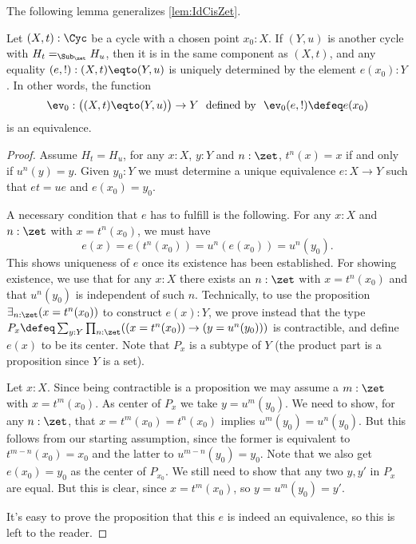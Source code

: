 The following lemma generalizes \cref{lem:IdCisZet}.

\begin{lemma}\label{lem:IdCycle}
  Let $(X,t):\Cyc$ be a cycle with a chosen point $x_0:X$.
  If $(Y,u)$ is another cycle with $H_t =_{\Sub_\zet} H_u$,
  then it is in the same component as $(X,t)$,
  and any equality $(e,!) : (X,t)\eqto(Y,u)$
  is uniquely determined by the element $e(x_0):Y$.
  In other words, the function
  \[
    \ev_0:\bigl((X,t)\eqto(Y,u)\bigr)\to Y
    \text{~~defined by~~} \ev_0(e,!) \defeq e(x_0)
  \]
  is an equivalence.
\end{lemma}
\begin{proof}
  Assume $H_t=H_u$, \ie for any $x:X$, $y:Y$ and $n:\zet$,
  $t^n(x)=x$ if and only if $u^n(y)=y$.
  Given $y_0:Y$ we must determine a unique equivalence $e:X\to Y$
  such that $et=ue$ and $e(x_0)=y_0$.

  A necessary condition that $e$ has to fulfill is the following. 
  For any $x:X$ and $n:\zet$ with $x=t^n(x_0)$, we must have
  \[
    e(x)=e(t^n(x_0))=u^n(e(x_0))=u^n(y_0).
  \]
  This shows uniqueness of $e$ once its existence has been established.
  For showing existence, we use that for any $x:X$ there exists an
  $n:\zet$ with $x=t^n(x_0)$ and that $u^n(y_0)$ is independent of such $n$.
  Technically, to use the proposition $\exists_{n:\zet}(x=t^n(x_0))$ to
  construct $e(x):Y$, we prove instead that the type 
  $P_x\defeq\sum_{y:Y}\prod_{n:\zet}((x=t^n(x_0)) \to (y=u^n(y_0)))$
  is contractible, and define $e(x)$ to be its center.
  Note that $P_x$ is a subtype of $Y$
  (the product part is a proposition since $Y$ is a set).
  
  Let $x:X$. Since being contractible is a proposition we may
  assume a $m:\zet$ with $x=t^{m}(x_0)$.
  As center of $P_x$ we take $y=u^{m}(y_0)$.
  We need to show, for any $n:\zet$,
  that $x=t^m(x_0)=t^n(x_0)$ implies $u^m(y_0)=u^n(y_0)$.
  But this follows from our starting assumption, since
  the former is equivalent to $t^{m-n}(x_0)=x_0$
  and the latter to $u^{m-n}(y_0)=y_0$.
  Note that we also get $e(x_0)=y_0$ as the center of $P_{x_0}$.
  We still need to show that any two $y,y'$ in $P_x$ are equal.
  But this is clear, since $x=t^{m}(x_0)$, so $y=u^{m}(y_0)=y'$.

  It's easy to prove the proposition that this $e$ is indeed an equivalence,
  so this is left to the reader.
\end{proof}
  
